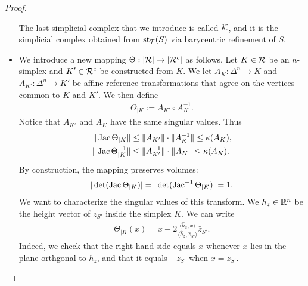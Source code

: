\documentclass[10pt,letterpaper]{article}
\begin{document}
\begin{proof}
\begin{itemize}
        The last simplicial complex that we introduce is called ${\mathcal K}$,
        and it is the simplicial complex obtained from $\operatorname{st}_{{\mathcal T}}(S)$ via barycentric refinement of $S$. 
        
                
        \item 
        We introduce a new mapping $\Theta : |{\mathcal R}| \rightarrow |{\mathcal R}^c|$ as follows.
        Let $K \in {\mathcal R}$ be an $n$-simplex and $K' \in {\mathcal R}^{c}$ be constructed from $K$.
        We let $A_{K} : \Delta^{n} \rightarrow K$ and $A_{K'} : \Delta^{n} \rightarrow K'$
        be affine reference transformations
        that agree on the vertices common to $K$ and $K'$.
        We then define 
        \begin{align*}
            \Theta_{|K} := A_{K'} \circ A_{K}^{-1}.
        \end{align*}
        Notice that $A_{K'}$ and $A_{K}$ have the same singular values. Thus
        \begin{align*}
            \| \operatorname{{\rm Jac}} \Theta_{|K}      \| &\leq \| A_{K'} \| \cdot \| A_{K}^{-1} \| \leq \kappa(A_{K}),
            \\
            \| \operatorname{{\rm Jac}} \Theta_{|K}^{-1} \| &\leq \| A_{K'}^{-1} \| \cdot \| A_{K} \| \leq \kappa(A_{K}).
        \end{align*}
        By construction, the mapping preserves volumes:
        \begin{align*}
            |\det( \operatorname{{\rm Jac}}      \Theta_{|K} )|
            = 
            |\det( \operatorname{{\rm Jac}}^{-1} \Theta_{|K} )|
            =
            1
            .
        \end{align*}
        We want to characterize the singular values of this transform. 
        We $h_z \in {\mathbb R}^{n}$ be the height vector of $z_{S'}$ inside the simplex $K$.
        We can write
        \begin{align*}
            \Theta_{|K}(x) 
            = 
            x
            - 
            2 \frac{\langle \hat h_z, x \rangle}{\langle \hat h_z, \hat z_{S'} \rangle}
            \hat z_{S'}
            .
        \end{align*}
        Indeed, we check that the right-hand side equals $x$ whenever $x$ lies in the plane orthgonal to $h_z$,
        and that it equals $-z_{S'}$ when $x = z_{S'}$.

\end{itemize}
\end{proof}
\end{document}
